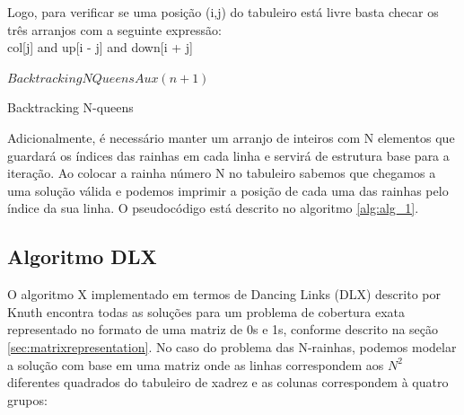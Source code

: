 \documentclass{article}
\begin{document}
Logo, para verificar se uma posição (i,j) do tabuleiro está livre basta checar os três arranjos com a seguinte expressão: \\

col[j] and up[i - j] and down[i + j] \\

\begin{algorithm}
\begin{algorithmic}[1]

    \Return
  \EndIf

      \State $ BacktrackingNQueensAux(n + 1) $
    \EndIf
  \EndFor
\EndProcedure

  \EndFor
  \EndFor

\EndProcedure

\end{algorithmic}
\caption{Backtracking N-queens}\label{alg:alg_1}
\end{algorithm}

Adicionalmente, é necessário manter um arranjo de inteiros com N elementos que guardará
os índices das rainhas em cada linha e servirá de estrutura base para a iteração. 
Ao colocar a rainha número N no tabuleiro sabemos que chegamos a uma solução válida e
podemos imprimir a posição de cada uma das rainhas pelo índice da sua linha.
O pseudocódigo está descrito no algoritmo \ref{alg:alg_1}. 

\subsection{Algoritmo DLX}

O algoritmo X implementado em termos de Dancing Links (DLX) descrito por Knuth \cite{knuth2000} 
encontra todas as soluções para um problema de cobertura exata representado no formato de
uma matriz de 0s e 1s, conforme descrito na seção \ref{sec:matrixrepresentation}. No caso
do problema das N-rainhas, podemos modelar a solução com base em uma matriz onde as linhas correspondem
aos $ N^2 $ diferentes quadrados do tabuleiro de xadrez e as colunas correspondem à quatro grupos:
\end{document}
